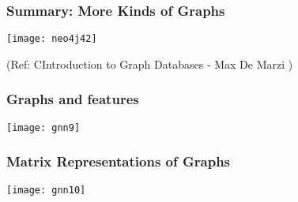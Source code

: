 

 


\begin{frame}\frametitle{Summary: More Kinds of Graphs}

\begin{center}
\texttt{[image: neo4j42]}
\end{center}
 

{\tiny (Ref: CIntroduction to Graph Databases - Max De Marzi )}
\end{frame}


\begin{frame}[fragile]\frametitle{Graphs and features}

\begin{center}
\texttt{[image: gnn9]}
\end{center}	  

\end{frame}

\begin{frame}[fragile]\frametitle{Matrix Representations of Graphs}

\begin{center}
\texttt{[image: gnn10]}
\end{center}	  

\end{frame}


